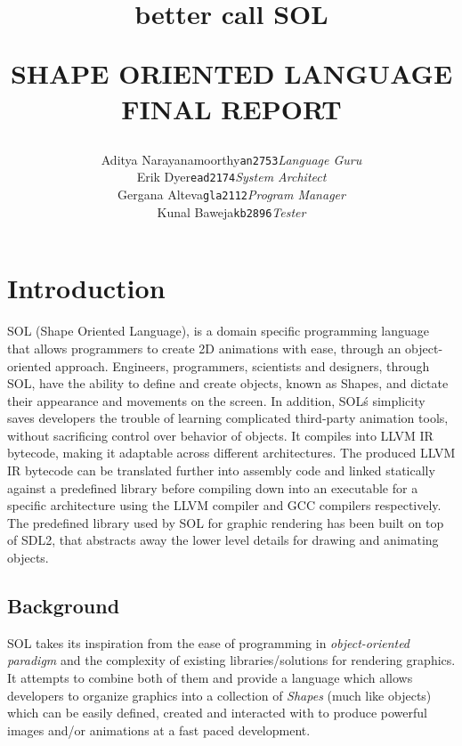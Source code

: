\documentclass[letterpaper,12pt]{report}
\begin{document}
\title{{\small better call} {\Huge \textbf{SOL}}\\
    \begin{center}{SHAPE ORIENTED LANGUAGE FINAL REPORT}\end{center}
}

\author{
\begin{tabular}{ lc lc lc }
Aditya Narayanamoorthy & \texttt{an2753}  & \textit{Language Guru}    \\
Erik Dyer              & \texttt{ead2174} & \textit{System Architect} \\
Gergana Alteva         & \texttt{gla2112} & \textit{Program Manager}  \\
Kunal Baweja           & \texttt{kb2896}  & \textit{Tester}
\end{tabular}
}

\maketitle

\tableofcontents{}

\chapter{Introduction}
  SOL (Shape Oriented Language), is a domain specific programming language that allows programmers to create 2D animations with ease, through an object-oriented approach. Engineers, programmers, scientists and designers, through SOL, have the ability to define and create objects, known as Shapes, and dictate their appearance and movements on the screen. In addition, SOL\'s simplicity saves developers the trouble of learning complicated third-party animation tools, without sacrificing control over behavior of objects. It compiles into LLVM IR bytecode, making it adaptable across different architectures. The produced LLVM IR bytecode can be translated further into assembly code and linked statically against a predefined library before compiling down into an executable for a specific architecture using the LLVM compiler and GCC compilers respectively. The predefined library used by SOL for graphic rendering has been built on top of SDL2, that abstracts away the lower level details for drawing and animating objects.

  \section{Background}
  SOL takes its inspiration from the ease of programming in \textit{object-oriented paradigm} and the complexity of existing libraries/solutions for rendering graphics. It attempts to combine both of them and provide a language which allows developers to organize graphics into a collection of \textit{Shapes} (much like objects) which can be easily defined, created and interacted with to produce powerful images and/or animations at a fast paced development.\\
\end{document}
